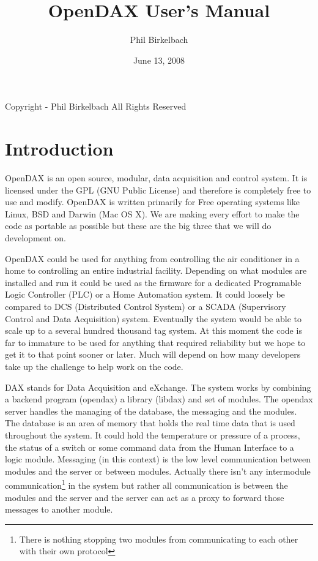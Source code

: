 

\title{OpenDAX User's Manual}
\date{June 13, 2008}
\author{Phil Birkelbach}



\maketitle

\begin{flushleft}
Copyright  - Phil Birkelbach\linebreak
All Rights Reserved
\end{flushleft}

\tableofcontents
\newpage
{}
\chapter{Introduction}
OpenDAX is an open source, modular, data acquisition and control system. It is licensed under the GPL (GNU Public License) and therefore is completely free to use and modify. OpenDAX is written primarily for Free operating systems like Linux, BSD and Darwin (Mac OS X). We are making every effort to make the code as portable as possible but these are the big three that we will do development on.

OpenDAX could be used for anything from controlling the air conditioner in a home to controlling an entire industrial facility. Depending on what modules are installed and run it could be used as the firmware for a dedicated Programable Logic Controller (PLC) or a Home Automation system. It could loosely be compared to DCS (Distributed Control System) or a SCADA (Supervisory Control and Data Acquisition) system. Eventually the system would be able to scale up to a several hundred thousand tag system. At this moment the code is far to immature to be used for anything that required reliability but we hope to get it to that point sooner or later. Much will depend on how many developers take up the challenge to help work on the code.

DAX stands for Data Acquisition and eXchange. The system works by combining a backend program (opendax) a library (libdax) and set of modules. The opendax server handles the managing of the database, the messaging and the modules.  The database is an area of memory that holds the real time data that is used throughout the system.  It could hold the temperature or pressure of a process, the status of a switch or some command data from the Human Interface to a logic module.  Messaging (in this context) is the low level communication between modules and the server or between modules.  Actually there isn't any intermodule communication\footnote{There is nothing stopping two modules from communicating to each other with their own protocol} in the system but rather all communication is between the modules and the server and the server can act as a proxy to forward those messages to another module.

